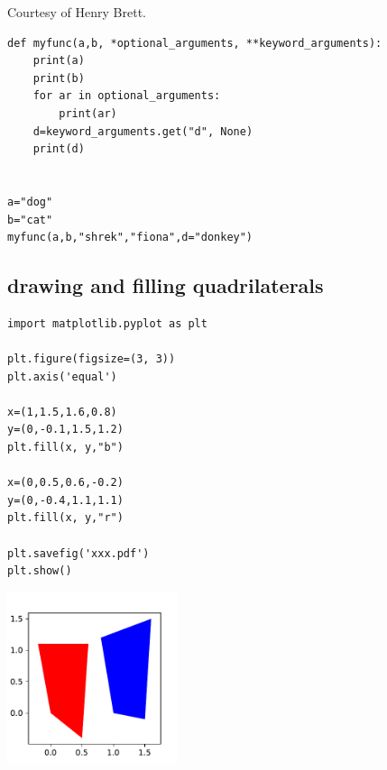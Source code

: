 Courtesy of Henry Brett.

\begin{lstlisting}
def myfunc(a,b, *optional_arguments, **keyword_arguments):
    print(a)
    print(b)
    for ar in optional_arguments:
        print(ar)
    d=keyword_arguments.get("d", None)
    print(d)
    

a="dog"
b="cat"
myfunc(a,b,"shrek","fiona",d="donkey")
\end{lstlisting}

\subsection{drawing and filling quadrilaterals}

\begin{lstlisting}
import matplotlib.pyplot as plt

plt.figure(figsize=(3, 3))
plt.axis('equal')

x=(1,1.5,1.6,0.8)
y=(0,-0.1,1.5,1.2)
plt.fill(x, y,"b")

x=(0,0.5,0.6,-0.2)
y=(0,-0.4,1.1,1.1)
plt.fill(x, y,"r")

plt.savefig('xxx.pdf')
plt.show()

\end{lstlisting}

\begin{center}
\includegraphics[width=5cm]{images/python/xxx}
\end{center}

